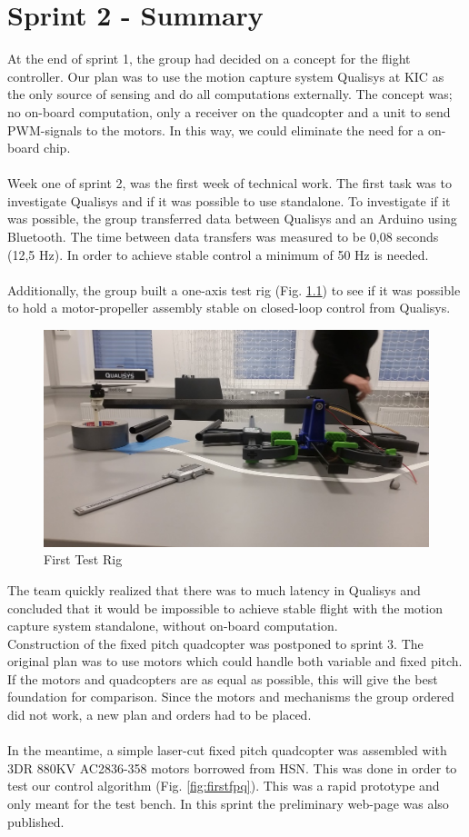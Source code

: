 \chapter{Sprint 2 - Summary}

At the end of sprint 1, the group had decided on a concept for the flight controller. Our plan was to use the motion capture system Qualisys at KIC as the only source of sensing and do all computations externally. The concept was; no on-board computation, only a receiver on the quadcopter and a unit to send PWM-signals to the motors. In this way, we could eliminate the need for a on-board chip. 
\\\\
Week one of sprint 2, was the first week of technical work. The first task was to investigate Qualisys and if it was possible to use standalone. To investigate if it was possible, the group transferred data between Qualisys and an Arduino using Bluetooth. The time between data transfers was measured to be 0,08 seconds (12,5 Hz). In order to achieve stable control a minimum of 50 Hz is needed.
\\\\
Additionally, the group built a one-axis test rig (Fig. \ref{fig:firsttestrig}) to see if it was possible to hold a motor-propeller assembly stable on closed-loop control from Qualisys.

\begin{figure}[h]
        \centering
        \includegraphics[width = 0.4
        \textwidth]{VAPIQ-PICTURES//TestRig(arm)1}
         \caption{First Test Rig}
         \label{fig:firsttestrig}
    \end{figure}   
\noindent
The team quickly realized that there was to much latency in Qualisys and concluded that it would be impossible to achieve stable flight with the motion capture system standalone, without on-board computation.
\\
Construction of the fixed pitch quadcopter was postponed to sprint 3. The original plan was to use motors which could handle both variable and fixed pitch. If the motors and quadcopters are as equal as possible, this will give the best foundation for comparison. Since the motors and mechanisms the group ordered did not work, a new plan and orders had to be placed. 
\\\\
In the meantime, a simple laser-cut fixed pitch quadcopter was assembled with 3DR 880KV AC2836-358 motors borrowed from HSN. This was done in order to test our control algorithm (Fig. \ref{fig:firstfpq}). This was a rapid prototype and only meant for the test bench. In this sprint the preliminary web-page was also published.

